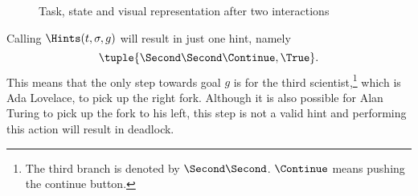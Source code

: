 \begin{figure}[t]
\begin{minipage}[r]{0.3\textwidth}
  \end{minipage}
  \caption{Task, state and visual representation after two interactions}
  \label{fig:dining-middle}
\end{figure}

Calling $\Hints(t,\sigma,g)$ will result in just one hint, namely
\begin{equation*}
  \tuple{\Second\Second\Continue,\True}.
\end{equation*}
This means that the only step towards goal $g$ is for the third scientist,\footnote{
  The third branch is denoted by $\Second\Second$.
  $\Continue$ means pushing the continue button.
}
which is Ada Lovelace, to pick up the right fork.
Although it is also possible for Alan Turing to pick up the fork to his left,
this step is not a valid hint and performing this action will result in deadlock.

